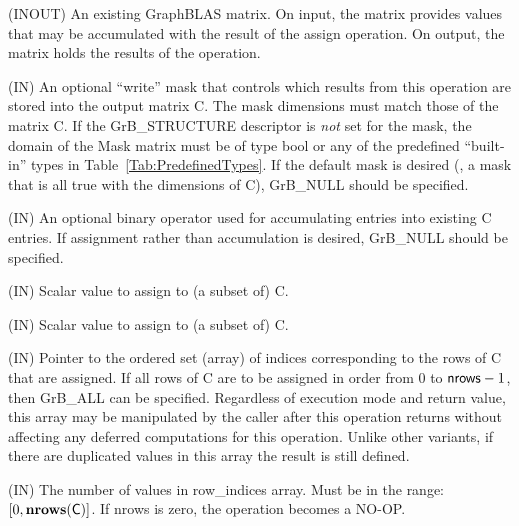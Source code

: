 \begin{itemize}[leftmargin=1.1in]
    \item[{\sf C}]    ({\sf INOUT}) An existing GraphBLAS matrix. On input,
    the matrix provides values that may be accumulated with the result of the
    assign operation.  On output, the matrix holds the results of the
    operation.

    \item[{\sf Mask}] ({\sf IN}) An optional ``write'' mask that controls which
    results from this operation are stored into the output matrix {\sf C}. The 
    mask dimensions must match those of the matrix {\sf C}. If the 
    {\sf GrB\_STRUCTURE} descriptor is {\em not} set for the mask, the domain of the 
    {\sf Mask} matrix must be of type {\sf bool} or any of the predefined 
    ``built-in'' types in Table~\ref{Tab:PredefinedTypes}.  If the default
    mask is desired (\ie, a mask that is all {\sf true} with the dimensions of {\sf C}), 
    {\sf GrB\_NULL} should be specified.

    \item[{\sf accum}] ({\sf IN}) An optional binary operator used for accumulating
    entries into existing {\sf C} entries.
    If assignment rather than accumulation is
    desired, {\sf GrB\_NULL} should be specified.

    \item[{\sf val}]    ({\sf IN}) Scalar value to assign to (a subset of) {\sf C}.
    
{\color{red}
    \item[{\sf s}]    ({\sf IN}) Scalar value to assign to (a subset of) {\sf C}.
}

    \item[{\sf row\_indices}] ({\sf IN}) Pointer to the ordered set (array) of 
    indices corresponding to the rows of {\sf C} that are assigned.  If all rows
    of {\sf C} are to be assigned in order from $0$ to ${\sf nrows} - 1$, then 
    {\sf GrB\_ALL} can be specified.  Regardless of execution mode and return 
    value, this array may be manipulated by the caller after this operation 
    returns without affecting any deferred computations for this operation.  
    Unlike other variants, if there are duplicated values in this array the 
    result is still defined.

    \item[{\sf nrows}] ({\sf IN}) The number of values in {\sf row\_indices}
    array. Must be in the range: $[0, \bold{nrows}({\sf C})]$.  If
    {\sf nrows} is zero, the operation becomes a NO-OP.


\end{itemize}
